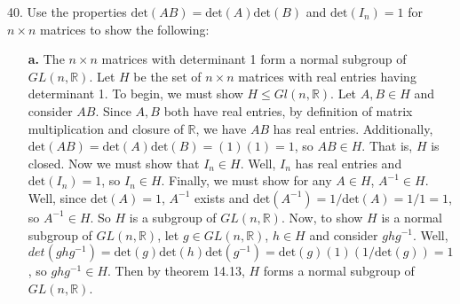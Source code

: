 \documentclass{article}
\begin{document}
40. Use the properties $\text{det}(AB) = \text{det}(A)\text{det}(B)$ and $\text{det}(I_n) = 1$ for $n \times n$ matrices to show the following:
\begin{enumerate}
    \item[\textbf{a.}] The $n \times n$ matrices with determinant 1 form a normal subgroup of $GL(n, \mathbb{R})$. 
    \newline\newline
    Let $H$ be the set of $n\times n$ matrices with real entries having determinant 1. To begin, we must show $H \leq Gl(n, \mathbb{R})$. Let $A,B \in H$ and consider $AB$. Since $A,B$ both have real entries, by definition of matrix multiplication and closure of $\mathbb{R}$, we have $AB$ has real entries. Additionally, $\text{det}(AB) = \text{det}(A)\text{det}(B) = (1)(1) = 1$, so $AB \in H$. That is, $H$ is closed. Now we must show that $I_n \in H$. Well, $I_n$ has real entries and $\text{det}(I_n) = 1$, so $I_n \in H$. Finally, we must show for any $A \in H$, $A^{-1} \in H$. Well, since $\text{det}(A) = 1$, $A^{-1}$ exists and $\text{det}(A^{-1}) = 1/\text{det}(A) = 1/1 = 1$, so $A^{-1} \in H$. So $H$ is a subgroup of $GL(n, \mathbb{R})$.
    \newline
    Now, to show $H$ is a normal subgroup of $GL(n, \mathbb{R})$, let $g \in GL(n, \mathbb{R})$, $h \in H$ and consider $ghg^{-1}$. Well, $det(ghg^{-1}) = \text{det}(g)\text{det}(h)\text{det}(g^{-1}) = \text{det}(g)(1)(1/\text{det}(g)) = 1$, so $ghg^{-1} \in H$. Then by theorem 14.13, $H$ forms a normal subgroup of $GL(n, \mathbb{R})$.
\end{enumerate}
\end{document}
